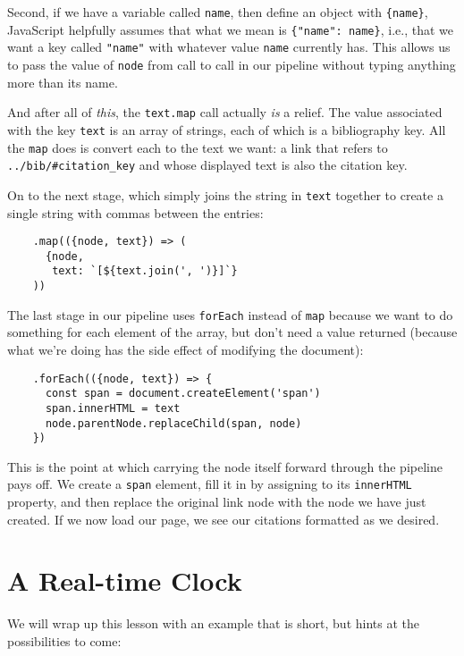 Second,
if we have a variable called \texttt{name},
then define an object with \texttt{\{name\}},
JavaScript helpfully assumes that what we mean is \texttt{\{"name":\ name\}},
i.e.,
that we want a key called \texttt{"name"}
with whatever value \texttt{name} currently has.
This allows us to pass the value of \texttt{node} from call to call in our pipeline
without typing anything more than its name.

And after all of \emph{this},
the \texttt{text.map} call actually \emph{is} a relief.
The value associated with the key \texttt{text} is an array of strings,
each of which is a bibliography key.
All the \texttt{map} does is convert each to the text we want:
a link that refers to \texttt{../bib/\#citation\_key} and whose displayed text is also the citation key.

On to the next stage,
which simply joins the string in \texttt{text} together to create a single string
with commas between the entries:

\begin{verbatim}
    .map(({node, text}) => (
      {node,
       text: `[${text.join(', ')}]`}
    ))
\end{verbatim}

The last stage in our pipeline uses \texttt{forEach} instead of \texttt{map}
because we want to do something for each element of the array,
but don't need a value returned
(because what we're doing has the side effect of modifying the document):

\begin{verbatim}
    .forEach(({node, text}) => {
      const span = document.createElement('span')
      span.innerHTML = text
      node.parentNode.replaceChild(span, node)
    })
\end{verbatim}

This is the point at which carrying the node itself forward through the pipeline pays off.
We create a \texttt{span} element,
fill it in by assigning to its \texttt{innerHTML} property,
and then replace the original link node with the node we have just created.
If we now load our page,
we see our citations formatted as we desired.

\section{A Real-time Clock}\label{s:pages-clock}

We will wrap up this lesson with an example that is short,
but hints at the possibilities to come:

